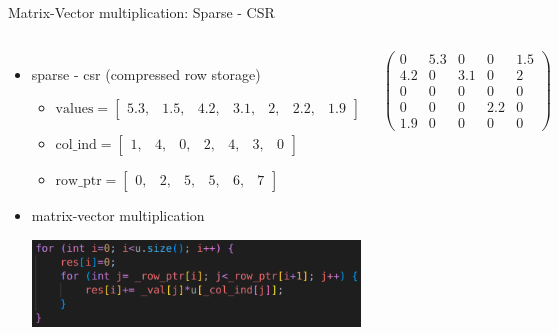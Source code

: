 \documentclass[aspectratio=169,xcolor=dvipsnames]{beamer}
\begin{document}
\begin{frame}{Matrix-Vector multiplication: Sparse - CSR}
    \begin{columns}[c] %

\begin{itemize}
\item sparse - csr (compressed row storage)
	\begin{itemize}
       \item $\mathrm{values} = \begin{bmatrix}
		5.3, & 1.5, & 4.2, & 3.1, & 2, & 2.2, & 1.9 
		\end{bmatrix}$
		\item $\mathrm{col\_ind} = \begin{bmatrix}
		1, & 4, & 0, & 2, & 4, & 3, & 0 
		\end{bmatrix}$
		\item $\mathrm{row\_ptr} = \begin{bmatrix}
		0, & 2, & 5, & 5, & 6, & 7 
		\end{bmatrix}$
	\end{itemize}
\item matrix-vector multiplication
\begin{center}
    \includegraphics[width=0.8\linewidth]{matrix_vector_csr.png}
    \end{center}
\end{itemize}
        
        $ \left( \begin{array}{rrrrr} 
0 & 5.3 & 0 & 0 & 1.5\\ 
4.2 & 0& 3.1 & 0 & 2\\ 
0 & 0 & 0 & 0 & 0 \\
0 & 0 & 0 & 2.2 & 0 \\
1.9 & 0 & 0 & 0 & 0
\end{array} \right) $

    \end{columns}
\end{frame}
\end{document}
